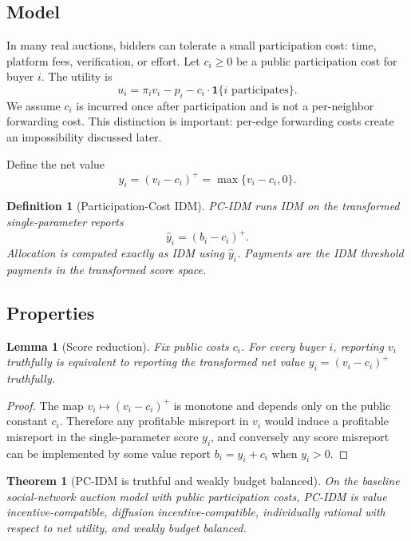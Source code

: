 \documentclass[11pt]{article}
\newtheorem{definition}{Definition}
\newtheorem{theorem}{Theorem}
\newtheorem{lemma}{Lemma}
\begin{document}
\subsection{Model}

In many real auctions, bidders can tolerate a small participation cost: time, platform fees, verification, or effort.  Let $c_i\ge 0$ be a public participation cost for buyer $i$.  The utility is
\[
    u_i=\pi_i v_i-p_i-c_i\cdot \mathbf{1}\{i\text{ participates}\}.
\]
We assume $c_i$ is incurred once after participation and is not a per-neighbor forwarding cost.  This distinction is important: per-edge forwarding costs create an impossibility discussed later.

Define the net value
\[
    y_i=(v_i-c_i)^+=\max\{v_i-c_i,0\}.
\]

\begin{definition}[Participation-Cost IDM]
PC-IDM runs IDM on the transformed single-parameter reports
\[
    \hat y_i=(b_i-c_i)^+.
\]
Allocation is computed exactly as IDM using $\hat y_i$.  Payments are the IDM threshold payments in the transformed score space.
\end{definition}

\subsection{Properties}

\begin{lemma}[Score reduction]
Fix public costs $c_i$.  For every buyer $i$, reporting $v_i$ truthfully is equivalent to reporting the transformed net value $y_i=(v_i-c_i)^+$ truthfully.
\end{lemma}

\begin{proof}
The map $v_i\mapsto (v_i-c_i)^+$ is monotone and depends only on the public constant $c_i$.  Therefore any profitable misreport in $v_i$ would induce a profitable misreport in the single-parameter score $y_i$, and conversely any score misreport can be implemented by some value report $b_i=y_i+c_i$ when $y_i>0$.
\end{proof}

\begin{theorem}[PC-IDM is truthful and weakly budget balanced]
On the baseline social-network auction model with public participation costs, PC-IDM is value incentive-compatible, diffusion incentive-compatible, individually rational with respect to net utility, and weakly budget balanced.
\end{theorem}
\end{document}
